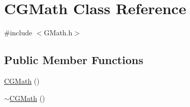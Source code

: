 \hypertarget{class_c_g_math}{}\section{C\+G\+Math Class Reference}
\label{class_c_g_math}


{\ttfamily \#include $<$G\+Math.\+h$>$}

\subsection*{Public Member Functions}
\begin{DoxyCompactItemize}
\item 
\hyperlink{class_c_g_math_a349fb12012c0328af792a972aeba4447}{C\+G\+Math} ()
\item 
\hyperlink{class_c_g_math_a008b7b9d332592e3e04cb63cfadb5b35}{$\sim$\+C\+G\+Math} ()
\end{DoxyCompactItemize}

